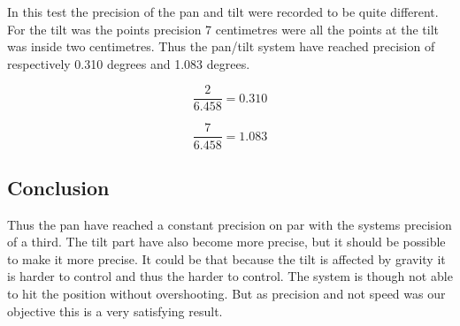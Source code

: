 In this test the precision of the pan and tilt were recorded to be quite different. For the tilt was the points precision 7 centimetres were all the points at the tilt was inside two centimetres. Thus the pan/tilt system have reached precision of respectively 0.310 degrees and 1.083 degrees.


\[ \frac{2}{6.458} = 0.310 \]

\[ \frac{7}{6.458} = 1.083 \]

\subsection{Conclusion}

Thus the pan have reached a constant precision on par with the systems precision of a third. The tilt part have also become more precise, but it should be possible to make it more precise. It could be that because the tilt is affected by gravity it is harder to control and thus the harder to control.  The system is though not able to hit the position without overshooting. But as precision and not speed was our objective this is a very satisfying result.